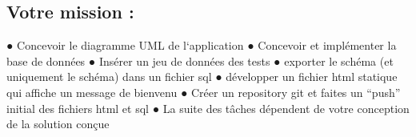 \subsection{Votre mission :}
● Concevoir le diagramme UML de l‘application
● Concevoir et implémenter la base de données
● Insérer un jeu de données des tests
● exporter le schéma (et uniquement le schéma) dans un fichier sql
● développer un fichier html statique qui affiche un message de bienvenu
● Créer un repository git et faites un “push” initial des fichiers html et sql
● La suite des tâches dépendent de votre conception de la solution conçue

